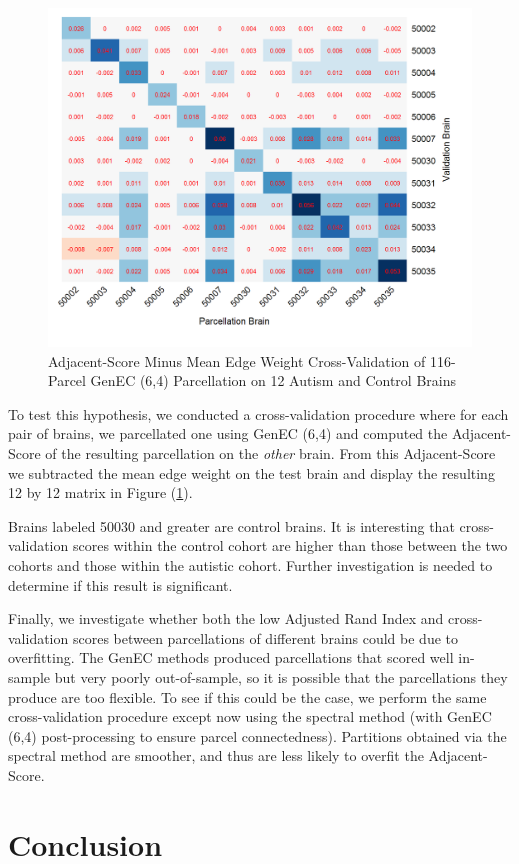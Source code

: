 \begin{figure}
\caption{Adjacent-Score Minus Mean Edge Weight Cross-Validation of
116-Parcel GenEC (6,4) Parcellation on 12 Autism and Control Brains}
\label{cv_ec}
\includegraphics[scale = 1]{figs/8_cv_ec.png}
\end{figure}

To test this hypothesis, we conducted a cross-validation procedure where
for each pair of brains, we parcellated one using GenEC (6,4) and
computed the Adjacent-Score of the resulting parcellation on the
\textit{other} brain. From this Adjacent-Score we subtracted the mean
edge weight on the test brain and display the resulting 12 by 12 matrix
in Figure (\ref{cv_ec}).

Brains labeled 50030 and greater are control brains. It is interesting
that cross-validation scores within the control cohort are higher than
those between the two cohorts and those within the autistic cohort.
Further investigation is needed to determine if this result is
significant.

Finally, we investigate whether both the low Adjusted Rand Index and
cross-validation scores between parcellations of different brains could
be due to overfitting. The GenEC methods produced parcellations that
scored well in-sample but very poorly out-of-sample, so it is possible
that the parcellations they produce are too flexible. To see if this
could be the case, we perform the same cross-validation procedure
except now using the spectral method (with GenEC (6,4) post-processing
to ensure parcel connectedness). Partitions obtained via the spectral
method are smoother, and thus are less likely to overfit the
Adjacent-Score.

\section{Conclusion}


